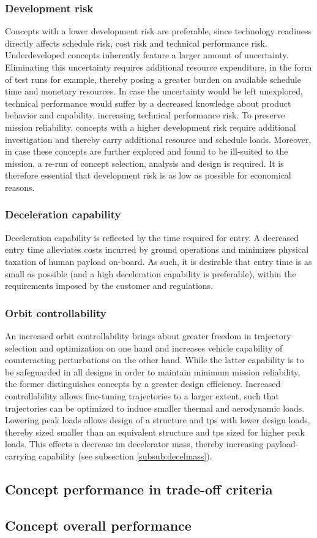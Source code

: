 \subsubsection{Development risk}
Concepts with a lower development risk are preferable, since technology readiness directly affects schedule risk, cost risk and technical performance risk. Underdeveloped concepts inherently feature a larger amount of uncertainty. Eliminating this uncertainty requires additional resource expenditure, in the form of test runs for example, thereby posing a greater burden on available schedule time and monetary resources. In case the uncertainty would be left unexplored, technical performance would suffer by a decreased knowledge about product behavior and capability, increasing technical performance risk. To preserve mission reliability, concepts with a higher development risk require additional investigation and thereby carry additional resource and schedule loads. Moreover, in case these concepts are further explored and found to be ill-suited to the mission, a re-run of concept selection, analysis and design is required. It is therefore essential that development risk is as low as possible for economical reasons.

\subsubsection{Deceleration capability}
Deceleration capability is reflected by the time required for entry. A decreased entry time alleviates costs incurred by ground operations and minimizes physical taxation of human payload on-board. As such, it is desirable that entry time is as small as possible (and a high deceleration capability is preferable), within the requirements imposed by the customer and regulations. 

\subsubsection{Orbit controllability}
An increased orbit controllability brings about greater freedom in trajectory selection and optimization on one hand and increases vehicle capability of counteracting perturbations on the other hand. While the latter capability is to be safeguarded in all designs in order to maintain minimum mission reliability, the former distinguishes concepts by a greater design efficiency. Increased controllability allows fine-tuning trajectories to a larger extent, such that trajectories can be optimized to induce smaller thermal and aerodynamic loads. Lowering peak loads allows design of a structure and \acrfull{tps} with lower design loads, thereby sized smaller than an equivalent structure and \gls{tps} sized for higher peak loads. This effects a decrease im decelerator mass, thereby increasing payload-carrying capability (see subsection \ref{subsub:decelmass}).

\subsection{Concept performance in trade-off criteria}

\subsection{Concept overall performance}

